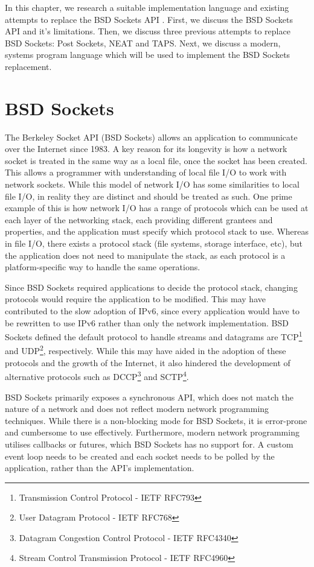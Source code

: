 In this chapter, we research a suitable implementation language and existing attempts to replace the BSD Sockets API .
First, we discuss the BSD Sockets API and it's limitations.
Then, we discuss three previous attempts to replace BSD Sockets: Post Sockets, NEAT and TAPS.
Next, we discuss a modern, systems program language which will be used to implement the BSD Sockets replacement.

\section{BSD Sockets}\label{sec:bsd-sockets}
The Berkeley Socket API (BSD Sockets) allows an application to communicate over the Internet since 1983.
A key reason for its longevity is how a network socket is treated in the same way as a local file, once the socket has
been created.
This allows a programmer with understanding of local file I/O to work with network sockets.
While this model of network I/O has some similarities to local file I/O, in reality they are distinct and should be
treated as such.
One prime example of this is how network I/O has a range of protocols which can be used at each layer of the networking
stack, each providing different grantees and properties, and the application must specify which protocol stack to use.
Whereas in file I/O, there exists a protocol stack (file systems, storage interface, etc), but the application does not
need to manipulate the stack, as each protocol is a platform-specific way to handle the same operations.

Since BSD Sockets required applications to decide the protocol stack, changing protocols would require the application
to be modified.
This may have contributed to the slow adoption of IPv6, since every application would have to be rewritten to use IPv6
rather than only the network implementation.
BSD Sockets defined the default protocol to handle streams and datagrams are
TCP\footnote{Transmission Control Protocol - IETF RFC793} and UDP\footnote{User Datagram Protocol - IETF RFC768},
respectively.
While this may have aided in the adoption of these protocols and the growth of the Internet, it also hindered the
development of alternative protocols such as DCCP\footnote{Datagram Congestion Control Protocol - IETF RFC4340} and
SCTP\footnote{Stream Control Transmission Protocol - IETF RFC4960}.

BSD Sockets primarily exposes a synchronous API, which does not match the nature of a network and does not reflect
modern network programming techniques.
While there is a non-blocking mode for BSD Sockets, it is error-prone and cumbersome to use effectively.
Furthermore, modern network programming utilises callbacks or futures, which BSD Sockets has no support for.
A custom event loop needs to be created and each socket needs to be polled by the application, rather than the API's
implementation.


